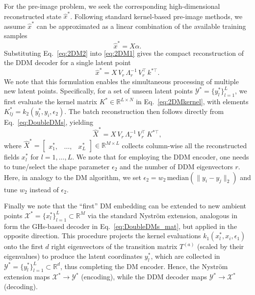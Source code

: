 \documentclass{article}
\begin{document}
For the pre-image problem, we seek the corresponding high-dimensional reconstructed state $\hat{x}^*$. Following standard kernel-based pre-image methods, we assume $\hat{x}^*$ can be approximated as a linear combination of the available training samples
\begin{equation}
\hat{x}^* = X\alpha.
\label{eq:2DM1}
\end{equation}
Substituting Eq.~\eqref{eq:2DM2} into \eqref{eq:2DM1} gives the compact reconstruction of the DDM decoder for a single latent point
\begin{equation}
    \hat{x}^* = X\,V_r\, \Lambda_r^{-1} \, V_r^\top \, k^{*\top}.
\label{eq:DoubleDMs}
\end{equation}
We note that this formulation enables the simultaneous processing of multiple new latent points. Specifically, for a set of unseen latent points $\mathcal{Y}^*=\{ y^*_l\}_{l=1}^L$, %
we first evaluate the kernel matrix $K^*\in \mathbb{R}^{L \times N}$ in Eq.~\eqref{eq:2DMkernel}, with elements $K^*_{lj} = k_2(y^*_l,y_i,\epsilon_2)$. The batch reconstruction then follows directly from Eq.~\eqref{eq:DoubleDMs}, yielding
\begin{equation}
    \widehat{X}^* = X\,V_r\, \Lambda_r^{-1} \, V_r^\top \, K^{*\top},
    \label{eq:DoubleDMs_mat}
\end{equation}
where $\widehat{X}^*=\begin{bmatrix} x^*_1, & \ldots, & x^*_L \end{bmatrix} \in \mathbb{R}^{M \times L}$ collects column-wise all the reconstructed fields $x_l^*$ for $l=1,\ldots,L$. We note that for employing the DDM encoder, one needs to tune/select the shape parameter $\epsilon_2$ and the number of DDM eigenvectors $r$. Here, in analogy to the DM algorithm, we set $\epsilon_2=w_2\, \text{median}(\|y_i-y_j\|_2)$ and tune $w_2$ instead of $\epsilon_2$.%

Finally we note that the ``first'' DM embedding can be extended to new ambient points $\mathcal{X}^* = \{ x^*_l\}_{l=1}^L\subset \mathbb{R}^M$ via the standard Nystr\"{o}m extension, analogous in form the GHs-based decoder in Eq.~\eqref{eq:DoubleDMs_mat}, but applied in the opposite direction. This procedure projects the kernel evaluations $k_1(x^*_l,x_i,\epsilon_1)$ onto the first $d$ right eigenvectors of the transition matrix $T^{(a)}$ (scaled by their eigenvalues) to produce the latent coordinates $y^*_l$, which are collected in $\mathcal{Y}^* = \{ y^*_l\}_{l=1}^L\subset \mathbb{R}^d$, thus completing the DM encoder. Hence, the Nystr\"{o}m extension maps $\mathcal{X}^* \to \mathcal{Y}^*$ (encoding), while the DDM decoder maps $\mathcal{Y}^* \to \mathcal{X}^*$ (decoding).
\end{document}
